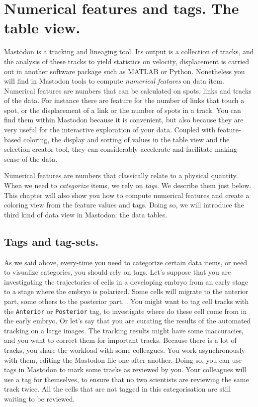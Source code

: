 \section{Numerical features and tags. The table view.}

Mastodon is a tracking and lineaging tool.
Its output is a collection of tracks, and the analysis of these tracks to yield statistics on \eg velocity, displacement \etc is carried out in another software package such as MATLAB or Python.
Nonetheless you will find in Mastodon tools to compute \textit{numerical features} on data item. 
Numerical features are numbers that can be calculated on spots, links and tracks of the data. 
For instance there are feature for the number of links that touch a spot, or the displacement of a link or the number of spots in a track.
You can find them within Mastodon because it is convenient, but also because they are very useful for the interactive exploration of your data. 
Coupled with feature-based coloring, the display and sorting of values in the table view and the selection creator tool, they can considerably accelerate and facilitate making sense of the data.

Numerical features are numbers that classically relate to a physical quantity.
When we need to \textit{categorize} items, we rely on \textit{tags}.
We describe them just below. 
This chapter will also show you how to compute numerical features and create a coloring view from the feature values and  tags.
Doing so, we will introduce the third kind of data view in Mastodon: the data tables.


\subsection{Tags and tag-sets.}

As we said above, every-time you need to categorize certain data items, or need to visualize categories, you should rely on tags.
Let's suppose that you are investigating the trajectories of cells in a developing embryo from an early stage to a stage where the embryo is polarized.
Some cells will migrate to the anterior part, some others to the posterior part, \etc. 
You might want to tag cell tracks with the \texttt{Anterior} or \texttt{Posterior} tag, to investigate where do these cell come from in the early embryo.
Or let's say that you are curating the results of the automated tracking on a large images. 
The tracking results might have some inaccuracies, and you want to correct them for important tracks.
Because there is a lot of tracks, you share the workload with some colleagues. 
You work asynchronously with them, editing the Mastodon file one after another. 
Doing so, you can use tags in Mastodon to mark some tracks as reviewed by you.
Your colleagues will use a tag for themselves, to ensure that no two scientists are reviewing the same track twice.
All the cells that are not tagged in this categorisation are still waiting to be reviewed. 


